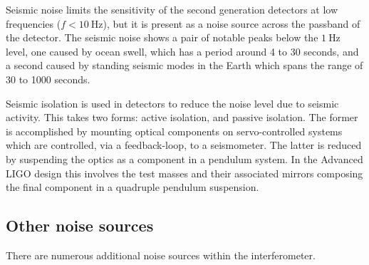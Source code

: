 Seismic noise limits the sensitivity of the second generation
detectors at low frequencies ($f < \SI{10}{\hertz}$), but it is
present as a noise source across the passband of the detector. The
seismic noise shows a pair of notable peaks below the $\SI{1}{\hertz}$
level, one caused by ocean swell, which has a period around 4 to 30
seconds, and a second caused by standing seismic modes in the Earth
which spans the range of 30 to 1000 seconds.

Seismic isolation is used in detectors to reduce the noise level due
to seismic activity. This takes two forms: active isolation, and
passive isolation. The former is accomplished by mounting optical
components on servo-controlled systems which are controlled, via a
feedback-loop, to a seismometer. The latter is reduced by suspending
the optics as a component in a pendulum system. In the Advanced LIGO
design this involves the test masses and their associated mirrors
composing the final component in a quadruple pendulum suspension.



\subsection{Other noise sources}
\label{sec:other-noise-sources}
There are numerous additional noise sources within the interferometer.

